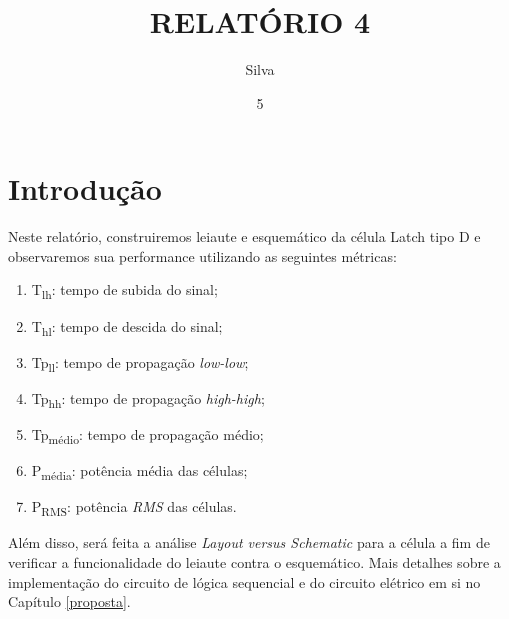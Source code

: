 \documentclass{iiufrgs}
\title{RELATÓRIO 4}
\author{Silva}{Henrique Corrêa Pereira da}
\date{5}{2018}
\begin{document}
\maketitle


\tableofcontents






%

\chapter{Introdução}\label{intro}

Neste relatório, construiremos leiaute e esquemático da célula Latch tipo D e observaremos sua performance utilizando as seguintes métricas:

\begin{enumerate}[leftmargin=3em, noitemsep] %
    \setlength{\itemindent}{1em}
    \item T\textsubscript{lh}: tempo de subida do sinal;
    \item T\textsubscript{hl}: tempo de descida do sinal;
    \item Tp\textsubscript{ll}: tempo de propagação \textit{low-low}; 
    \item Tp\textsubscript{hh}: tempo de propagação \textit{high-high}; 
    \item Tp\textsubscript{médio}: tempo de propagação médio; 
    \item P\textsubscript{média}: potência média das células; 
    \item P\textsubscript{RMS}: potência \textit{RMS} das células.
\end{enumerate}

Além disso, será feita a análise \textit{Layout versus Schematic} para a célula a fim de  verificar a funcionalidade do leiaute contra o esquemático. Mais detalhes sobre a implementação do circuito de lógica sequencial e do circuito elétrico em si no Capítulo \ref{proposta}. \
\end{document}
